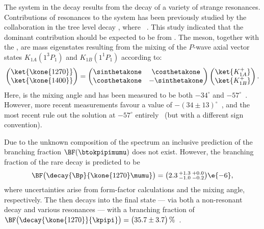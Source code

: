 The \kpipi system in the decay \btokpipimumu results from the decay of a variety of strange
resonances.
Contributions of resonances to the \kpipi system has been previously studied by the \belle
collaboration in the tree level decay \btojpsikpipi, where \jpsitomumu~\cite{Guler:2010if}.
This study indicated that the dominant contribution should be expected
to be from .
The  meson, together with the , are mass eigenstates resulting from the
mixing of the $P$-wave axial vector states $K_{1A}(1^3P_1)$ and $K_{1B}(1^1P_1)$ according to:
\begin{equation}
  \begin{pmatrix}
    \ket{\kone{1270}} \\
    \ket{\kone{1400}}
  \end{pmatrix}
  =
  \begin{pmatrix}
    \sinthetakone & \costhetakone \\
    \costhetakone & -\sinthetakone
  \end{pmatrix}
  \begin{pmatrix}
    \ket{K_{1A}^+} \\
    \ket{K_{1B}^+}
  \end{pmatrix}.
  \label{eq:k1mixing}
\end{equation}
Here, \thetakone is the mixing angle and has been measured to be both $-34^\circ$ and
$-57^\circ$~\cite{PhysRevD.47.1252,Tayduganov:2011ui,Hatanaka:2008xj,Cheng:2011pb,Divotgey:2013jba,Cheng:2013cwa}.
However, more recent measurements favour a value of
$-(34\pm13)^\circ$~\cite{Hatanaka:2008xj,Cheng:2011pb,Divotgey:2013jba,Cheng:2013cwa},
and the most recent rule out the solution at $-57^\circ$ entirely~\cite{Divotgey:2013jba,Cheng:2013cwa}
(but with a different sign convention).



Due to the unknown composition of the \mass{\kpipi} spectrum an inclusive prediction of the
branching fraction $\BF(\btokpipimumu)$ does not exist.
However, the branching fraction of the rare decay  is predicted to
be~\cite{Hatanaka:2008gu}
\begin{equation}
  \BF\big(\decay{\Bp}{\kone{1270}\mumu}\big) = \big(2.3\,^{+1.3}_{-1.0}\,^{+0.0}_{-0.2}\big)\e{-6},
\end{equation}
where uncertainties arise from form-factor calculations and the mixing angle, respectively.
The  then decays into the \kpipi final state
--- via both a non-resonant decay and various resonances ---
with a branching fraction of
$\BF\big(\decay{\kone{1270}}{\kpipi}\big)=\big(35.7\pm3.7\big)\,\%$~\cite{PDG2012}.

